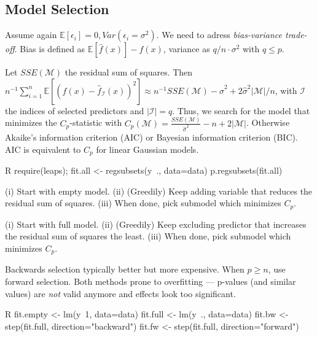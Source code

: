 \subsection{Model Selection}\label{subsec:model_selection}
\begin{sectionbox}\nospacing{}
  Assume again $\mathbb{E}[\epsilon_{i}] = 0, Var(\epsilon_{i} = \sigma^{2})$.
  We need to adress \emph{bias-variance trade-off}.
  Bias is defined as $\mathbb{E} [\hat f(x)] - f(x)$, variance as $q/n \cdot \sigma^{2}$ with $q \leq p$.
\end{sectionbox}
\begin{sectionbox}\nospacing{}
  Let $SSE(\mathcal{M})$ the residual sum of squares.
  Then $n^{-1} \sum_{i=1}^{n} \mathbb{E}\left[{(f(x) - \hat f_{\mathcal{I}}(x))}^{2}\right] \approx n^{-1}SSE(\mathcal{M})-\hat \sigma^{2} + 2\hat\sigma^{2}|\mathcal{M}|/n$, with $\mathcal{I}$ the indices of selected predictors and $|\mathcal{I}| = q$.
  Thus, we search for the model that minimizes the $C_{p}$-statistic with $C_{p}(\mathcal{M}) = \frac{SSE(\mathcal{M})}{\hat \sigma^{2}} - n + 2|\mathcal{M}|$.
  Otherwise Akaike's information criterion (AIC) or Bayesian information criterion (BIC). AIC is equivalent to $C_{p}$ for linear Gaussian models.
  \begin{mintlinebox}{R}
    require(leaps); fit.all <- regsubsets(y~., data=data)
    p.regsubsets(fit.all)
  \end{mintlinebox}
\end{sectionbox}
\begin{sectionbox}\nospacing{}
  \begin{description}[topsep=0pt,itemsep=-1ex,partopsep=1ex,parsep=1ex]
    \item[Forward selection] (i) Start with empty model. (ii) (Greedily) Keep adding variable that reduces the residual sum of squares. (iii) When done, pick submodel which minimizes $C_{p}$.
    \item[Backward selection] (i) Start with full model. (ii) (Greedily) Keep excluding predictor that increases the residual sum of squares the least. (iii) When done, pick submodel which minimizes $C_{p}$.
  \end{description}
  Backwards selection typically better but more expensive. When $p \geq n$, use forward selection.
  Both methods prone to overfitting --- p-values (and similar values) are \emph{not} valid anymore and effects look too significant.
  \begin{mintlinebox}{R}
    fit.empty <- lm(y~1, data=data)
    fit.full <- lm(y~., data=data)
    fit.bw <- step(fit.full, direction="backward")
    fit.fw <- step(fit.full, direction="forward")
  \end{mintlinebox}

\end{sectionbox}


